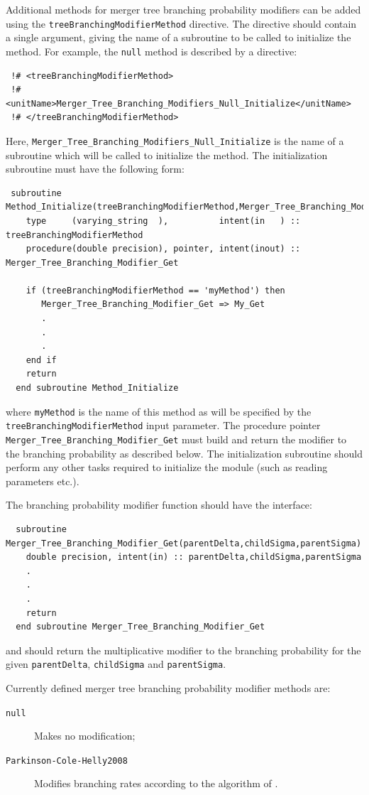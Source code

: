 Additional methods for merger tree branching probability modifiers can be added using the {\tt treeBranchingModifierMethod} directive. The directive should contain a single argument, giving the name of a subroutine to be called to initialize the method. For example, the {\tt null} method is described by a directive:
\begin{verbatim}
 !# <treeBranchingModifierMethod>
 !#  <unitName>Merger_Tree_Branching_Modifiers_Null_Initialize</unitName>
 !# </treeBranchingModifierMethod>
\end{verbatim}
Here, {\tt Merger\_Tree\_Branching\_Modifiers\_Null\_Initialize} is the name of a subroutine which will be called to initialize the method. The initialization subroutine must have the following form:
\begin{verbatim}
 subroutine Method_Initialize(treeBranchingModifierMethod,Merger_Tree_Branching_Modifier_Get)
    type     (varying_string  ),          intent(in   ) :: treeBranchingModifierMethod
    procedure(double precision), pointer, intent(inout) :: Merger_Tree_Branching_Modifier_Get
    
    if (treeBranchingModifierMethod == 'myMethod') then
       Merger_Tree_Branching_Modifier_Get => My_Get
       .
       .
       .
    end if
    return
  end subroutine Method_Initialize
\end{verbatim}
where {\tt myMethod} is the name of this method as will be specified by the {\tt treeBranchingModifierMethod} input parameter. The procedure pointer {\tt Merger\_Tree\_Branching\_Modifier\_Get} must build and return the modifier to the branching probability as described below. The initialization subroutine should perform any other tasks required to initialize the module (such as reading parameters etc.).

The branching probability modifier function should have the interface:
\begin{verbatim}
  subroutine Merger_Tree_Branching_Modifier_Get(parentDelta,childSigma,parentSigma)
    double precision, intent(in) :: parentDelta,childSigma,parentSigma
    .
    .
    .
    return
  end subroutine Merger_Tree_Branching_Modifier_Get
\end{verbatim}
and should return the multiplicative modifier to the branching probability for the given {\tt parentDelta}, {\tt childSigma} and {\tt parentSigma}.

Currently defined merger tree branching probability modifier methods are:
\begin{description}
 \item [{\tt null}] Makes no modification;
 \item [{\tt Parkinson-Cole-Helly2008}] Modifies branching rates according to the algorithm of \cite{parkinson_generating_2008}.
\end{description}

